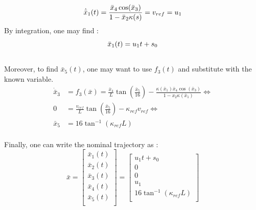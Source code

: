 \begin{equation}\begin{align}
    \dot{\Bar{x}}_1(t) =  \frac{\bar{x}_4 \cos(\bar{x}_3)}{1 - \bar{x}_2\kappa(s)}
        =v_{ref} = u_1  
\end{align} \end{equation}
By integration, one may find :
\begin{equation}
    \Bar{x}_1(t) = u_1 t + s_0
\end{equation}
\\
Moreover, to find $\bar{x}_5(t)$,  one may want to use $f_3(t)$ and substitute with the known variable.
\begin{equation}\begin{align}
    \dot{\bar{x}}_3 &= f_3(\bar{x}) =
    \frac{\bar{x}_4}{L}\tan\left(\frac{\bar{x}_5}{16}\right) - \frac{\kappa(\bar{x}_1) \bar{x}_4 \cos(\bar{x}_3)}{1 - x_2 \kappa(\bar{x}_1)} \iff\\
    0 &= \frac{v_{ref}}{L}\tan\left(\frac{\bar{x}_5}{16}\right) - \kappa_{ref}v_{ref} \iff\\
    \bar{x}_5 &= 16\tan^{-1}\left(\kappa_{ref}L\right)
\end{align}\end{equation}
\\
 Finally, one can write the nominal trajectory as :
\begin{equation}
    \bar{x}
    =
    \left[ {\begin{array}{c}
        \bar{x}_1(t)\\
        \bar{x}_2(t)\\
        \bar{x}_3(t)\\
        \bar{x}_4(t)\\
        \bar{x}_5(t)\\
    \end{array} } \right]
    =
    \left[ {\begin{array}{c}
        u_1 t + s_0\\
        0\\
        0\\
        u_1\\
        16 \tan^{-1}(\kappa_{ref} L)\\
    \end{array} } \right]
    \label{eq:trajectory}
\end{equation}



